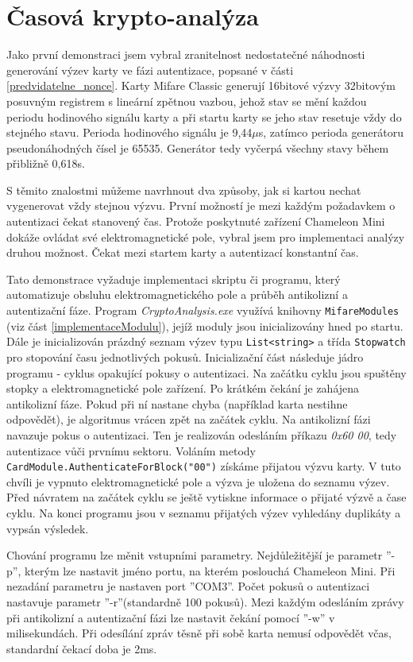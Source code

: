 \section{Časová krypto-analýza}
\label{casovaKryptoanalyza}
Jako první demonstraci jsem vybral zranitelnost nedostatečné náhodnosti generování výzev karty ve fázi autentizace, popsané v části \ref{predvidatelne_nonce}. Karty Mifare Classic generují 16bitové výzvy 32bitovým posuvným registrem s lineární zpětnou vazbou, jehož stav se mění každou periodu hodinového signálu karty a při startu karty se jeho stav resetuje vždy do stejného stavu. Perioda hodinového signálu je 9,44$\mu$s, zatímco perioda generátoru pseudonáhodných čísel je 65535. Generátor tedy vyčerpá všechny stavy během přibližně 0,618s. \par
S těmito znalostmi můžeme navrhnout dva způsoby, jak si kartou nechat vygenerovat vždy stejnou výzvu. První možností je mezi každým požadavkem o autentizaci čekat stanovený čas. Protože poskytnuté zařízení Chameleon Mini dokáže ovládat své elektromagnetické pole, vybral jsem pro implementaci analýzy druhou možnost. Čekat mezi startem karty a autentizací konstantní čas.\par
Tato demonstrace vyžaduje implementaci skriptu či programu, který automatizuje obsluhu elektromagnetického pole a průběh antikolizní a autentizační fáze. Program \emph{CryptoAnalysis.exe} využívá knihovny \verb|MifareModules| (viz část \ref{implementaceModulu}), jejíž moduly jsou inicializovány hned po startu. Dále je inicializován prázdný seznam výzev typu \verb|List<string>| a třída \verb|Stopwatch| pro stopování času jednotlivých pokusů. Inicializační část následuje jádro programu - cyklus opakující pokusy o autentizaci. Na začátku cyklu jsou spuštěny stopky a elektromagnetické pole zařízení. Po krátkém čekání je zahájena antikolizní fáze. Pokud při ní nastane chyba (například karta nestihne odpovědět), je algoritmus vrácen zpět na začátek cyklu. Na antikolizní fázi navazuje pokus o autentizaci. Ten je realizován odesláním příkazu \emph{0x60 00}, tedy autentizace vůči prvnímu sektoru. Voláním metody \verb|CardModule.AuthenticateForBlock("00")| získáme přijatou výzvu karty. V tuto chvíli je vypnuto elektromagnetické pole a výzva je uložena do seznamu výzev. Před návratem na začátek cyklu se ještě vytiskne informace o přijaté výzvě a čase cyklu. Na konci programu jsou v seznamu přijatých výzev vyhledány duplikáty a vypsán výsledek. \par
Chování programu lze měnit vstupními parametry. Nejdůležitější je parametr ''-p'', kterým lze nastavit jméno portu, na kterém poslouchá Chameleon Mini. Při nezadání parametru je nastaven port ''COM3''. Počet pokusů o autentizaci nastavuje parametr ''-r''(standardně 100 pokusů). Mezi každým odesláním zprávy při antikolizní a autentizační fázi lze nastavit čekání pomocí ''-w'' v milisekundách. Při odesílání zpráv těsně při sobě karta nemusí odpovědět včas, standardní čekací doba je 2ms. 

